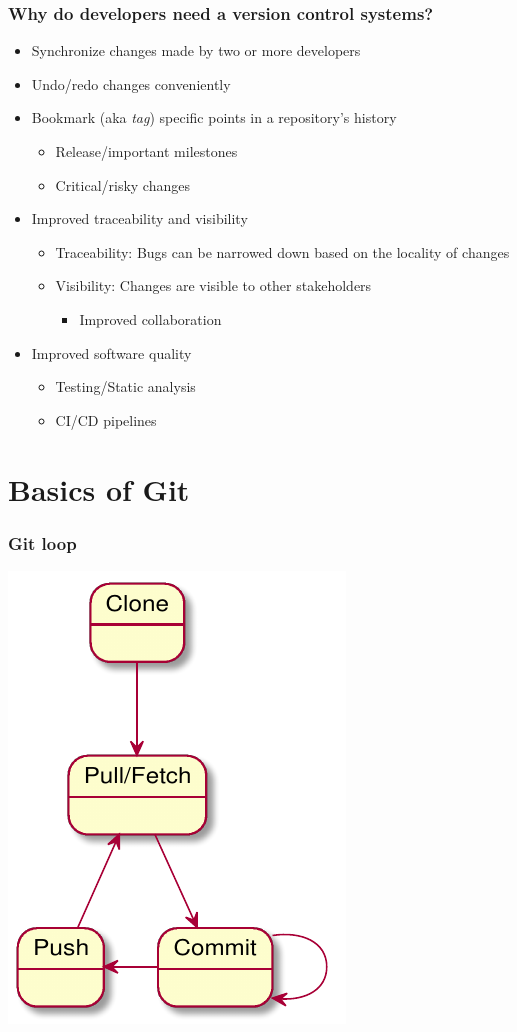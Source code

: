 \documentclass{beamer}
\begin{document}
\begin{frame}
  \frametitle{Why do developers need a version control systems?}
  \begin{itemize}
  \item<1-> Synchronize changes made by two or more developers
  \item<2-> Undo/redo changes conveniently
  \item<3-> Bookmark (aka \textit{tag}) specific points in a repository's history
    \begin{itemize}
    \item<4-> Release/important milestones
    \item<5-> Critical/risky changes
    \end{itemize}
  \item<6-> Improved traceability and visibility
    \begin{itemize}
    \item<7-> Traceability: Bugs can be narrowed down based on the locality of changes
    \item<8-> Visibility: Changes are visible to other stakeholders
      \begin{itemize}
      \item<8-> Improved collaboration
      \end{itemize}
    \end{itemize}
  \item<9-> Improved software quality
    \begin{itemize}
    \item<10-> Testing/Static analysis
    \item<11-> CI/CD pipelines
    \end{itemize}
  \end{itemize}
\end{frame}

\section{Basics of Git}
\begin{frame}
  \frametitle{Git loop}
  \centering
  \includegraphics{git_loop}
\end{frame}
\end{document}
